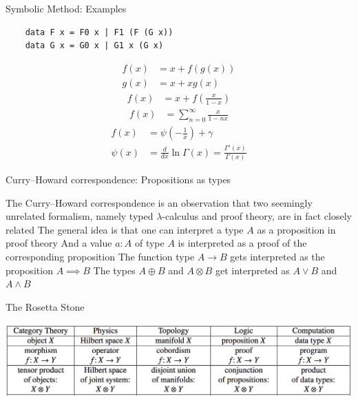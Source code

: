 \documentclass[pdf]{beamer}
\begin{document}
\begin{frame}[fragile]{Symbolic Method: Examples}
  \begin{verbatim}
    data F x = F0 x | F1 (F (G x))
    data G x = G0 x | G1 x (G x)
  \end{verbatim}
  \pause
  \begin{align*}
    f(x) &= x + f(g(x)) \\
    g(x) &= x + x g(x)
  \end{align*}
  \pause
  \begin{align*}
    f(x) &= x + f(\frac{x}{1-x})
  \end{align*}
  \pause
  \begin{align*}
    f(x) &= \sum_{n=0}^{\infty} \frac{x}{1-n x}
  \end{align*}
  \pause
  \begin{align*}
    f(x) &= \psi(-\frac{1}{x}) + \gamma \\
    \psi(x) &= \frac{d}{dx}\ln\Gamma(x) = \frac{\Gamma'(x)}{\Gamma(x)}
  \end{align*}
\end{frame}

\begin{frame}{Curry–Howard correspondence: Propositions as types}
  \begin{outline}
    \1 The Curry–Howard correspondence is an observation that two seemingly unrelated formalism, namely typed $\lambda$-calculus and proof theory, are in fact closely related
    \pause
    \1 The general idea is that one can interpret a type $A$ as a proposition in proof theory
    \pause
    \1 And a value $a : A$ of type $A$ is interpreted as a proof of the corresponding proposition
    \pause
    \1 The function type $A \to B$ gets interpreted as the proposition $A \implies B$
    \pause
    \1 The types $A \oplus B$ and $A \otimes B$ get interpreted as $A \lor B$ and $A \land B$
  \end{outline}
\end{frame}

\begin{frame}{The Rosetta Stone}
  \begin{center}
    \includegraphics[scale=0.47]{images/rosetta}
  \end{center}
\end{frame}
\end{document}
